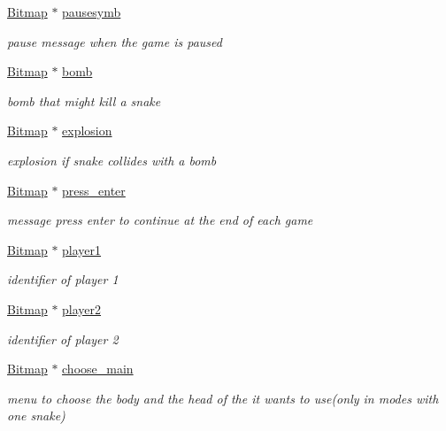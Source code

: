 \begin{DoxyCompactItemize}
\hyperlink{structBitmap}{Bitmap} $\ast$ \hyperlink{group__graphics_ga3b47ad4f61b00c3e5527f2bec90890b5}{pausesymb}
\begin{DoxyCompactList}\small\item\em pause message when the game is paused \end{DoxyCompactList}\item 
\hyperlink{structBitmap}{Bitmap} $\ast$ \hyperlink{group__graphics_ga86313247313ec7e1e264d13835d7d012}{bomb}
\begin{DoxyCompactList}\small\item\em bomb that might kill a snake \end{DoxyCompactList}\item 
\hyperlink{structBitmap}{Bitmap} $\ast$ \hyperlink{group__graphics_gac0df1ce2b02d6d52203766b8cb13c9bf}{explosion}
\begin{DoxyCompactList}\small\item\em explosion if snake collides with a bomb \end{DoxyCompactList}\item 
\hyperlink{structBitmap}{Bitmap} $\ast$ \hyperlink{group__graphics_gaf891e78c1cd9b89f53a3cf6032f88e71}{press\+\_\+enter}
\begin{DoxyCompactList}\small\item\em message press enter to continue at the end of each game \end{DoxyCompactList}\item 
\hyperlink{structBitmap}{Bitmap} $\ast$ \hyperlink{group__graphics_ga279ac50f42320cb39cbc02270e40597a}{player1}
\begin{DoxyCompactList}\small\item\em identifier of player 1 \end{DoxyCompactList}\item 
\hyperlink{structBitmap}{Bitmap} $\ast$ \hyperlink{group__graphics_gaaee24419ba914b7d473d1f5e06d84272}{player2}
\begin{DoxyCompactList}\small\item\em identifier of player 2 \end{DoxyCompactList}\item 
\hyperlink{structBitmap}{Bitmap} $\ast$ \hyperlink{group__graphics_ga0fe961b9b328a12b933b0e3d2393e9d4}{choose\+\_\+main}
\begin{DoxyCompactList}\small\item\em menu to choose the body and the head of the it wants to use(only in modes with one snake) \end{DoxyCompactList}\item 

\end{DoxyCompactItemize}
